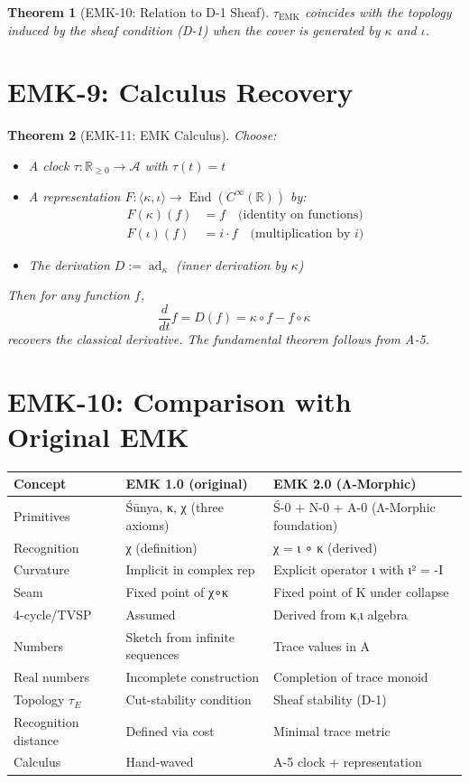 \documentclass[12pt, oneside]{article}
\newtheorem{theorem}{Theorem}[section]
\DeclareMathOperator{\ad}{ad}
\newcommand{\A}{\mathcal{A}}
\newcommand{\End}{\mathop{\mathrm{End}}}
\begin{document}
\begin{theorem}[EMK-10: Relation to D-1 Sheaf]
$\tau_{\text{EMK}}$ coincides with the topology induced by the sheaf condition (D-1) when the cover is generated by $\kappa$ and $\iota$.
\end{theorem}

\section{EMK-9: Calculus Recovery}

\begin{theorem}[EMK-11: EMK Calculus]
Choose:
\begin{itemize}
    \item A clock $\tau: \mathbb{R}_{\ge 0} \rightarrow \A$ with $\tau(t) = t$
    \item A representation $F: \langle \kappa, \iota \rangle \rightarrow \End(C^\infty(\mathbb{R}))$ by:
    \begin{align*}
        F(\kappa)(f) &= f \quad \text{(identity on functions)}\\
        F(\iota)(f) &= i \cdot f \quad \text{(multiplication by } i\text{)}
    \end{align*}
    \item The derivation $D := \ad_{\kappa}$ (inner derivation by $\kappa$)
\end{itemize}
Then for any function $f$,
\[
\frac{d}{dt} f = D(f) = \kappa \circ f - f \circ \kappa
\]
recovers the classical derivative. The fundamental theorem follows from A-5.
\end{theorem}

\section{EMK-10: Comparison with Original EMK}

\begin{tabular}{|l|l|l|}
\hline
\textbf{Concept} & \textbf{EMK 1.0 (original)} & \textbf{EMK 2.0 (Λ-Morphic)} \\
\hline
Primitives & Śūnya, κ, χ (three axioms) & Ś-0 + N-0 + A-0 (Λ-Morphic foundation) \\
Recognition & χ (definition) & χ = ι ∘ κ (derived) \\
Curvature & Implicit in complex rep & Explicit operator ι with ι² = -I \\
Seam & Fixed point of χ∘κ & Fixed point of K under collapse \\
4-cycle/TVSP & Assumed & Derived from κ,ι algebra \\
Numbers & Sketch from infinite sequences & Trace values in A \\
Real numbers & Incomplete construction & Completion of trace monoid \\
Topology $\tau_E$ & Cut-stability condition & Sheaf stability (D-1) \\
Recognition distance & Defined via cost & Minimal trace metric \\
Calculus & Hand-waved & A-5 clock + representation \\
\hline
\end{tabular}
\end{document}

